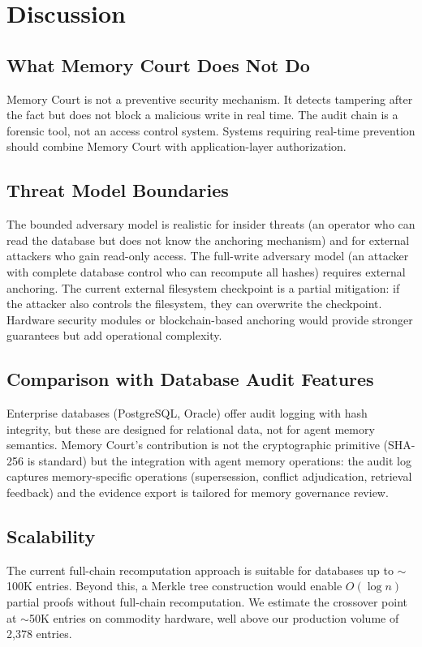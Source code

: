 \documentclass[sigconf,nonacm]{acmart}
\begin{document}
\section{Discussion}

\subsection{What Memory Court Does Not Do}
Memory Court is not a preventive security mechanism. It detects tampering after the fact but does not block a malicious write in real time. The audit chain is a forensic tool, not an access control system. Systems requiring real-time prevention should combine Memory Court with application-layer authorization.

\subsection{Threat Model Boundaries}
The bounded adversary model is realistic for insider threats (an operator who can read the database but does not know the anchoring mechanism) and for external attackers who gain read-only access. The full-write adversary model (an attacker with complete database control who can recompute all hashes) requires external anchoring. The current external filesystem checkpoint is a partial mitigation: if the attacker also controls the filesystem, they can overwrite the checkpoint. Hardware security modules or blockchain-based anchoring would provide stronger guarantees but add operational complexity.

\subsection{Comparison with Database Audit Features}
Enterprise databases (PostgreSQL, Oracle) offer audit logging with hash integrity, but these are designed for relational data, not for agent memory semantics. Memory Court's contribution is not the cryptographic primitive (SHA-256 is standard) but the integration with agent memory operations: the audit log captures memory-specific operations (supersession, conflict adjudication, retrieval feedback) and the evidence export is tailored for memory governance review.

\subsection{Scalability}
The current full-chain recomputation approach is suitable for databases up to $\sim$100K entries. Beyond this, a Merkle tree construction would enable $O(\log n)$ partial proofs without full-chain recomputation. We estimate the crossover point at $\sim$50K entries on commodity hardware, well above our production volume of 2,378 entries.
\end{document}
